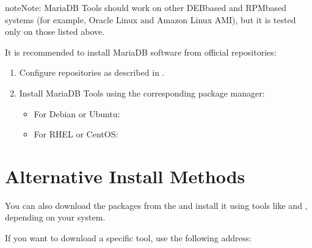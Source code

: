\documentclass[letterpaper,10pt,english]{sphinxmanual}
\begin{document}
\begin{sphinxadmonition}{note}{Note:}
MariaDB Tools should work on other DEB\sphinxhyphen{}based and RPM\sphinxhyphen{}based systems
(for example, Oracle Linux and Amazon Linux AMI),
but it is tested only on those listed above.
\end{sphinxadmonition}

It is recommended to install MariaDB software from official repositories:
\begin{enumerate}
%
\item {} 
Configure repositories as described in
.

\item {} 
Install MariaDB Tools using the corresponding package manager:
\begin{itemize}
\item {} 
For Debian or Ubuntu:

\begin{sphinxVerbatim}[commandchars=\\\{\}]
   
\end{sphinxVerbatim}

\item {} 
For RHEL or CentOS:

\begin{sphinxVerbatim}[commandchars=\\\{\}]
   
\end{sphinxVerbatim}

\end{itemize}

\end{enumerate}


\section{Alternative Install Methods}
\label{\detokenize{installation:alternative-install-methods}}
You can also download the packages from the
and install it using tools like  and ,
depending on your system.

If you want to download a specific tool, use the following address:
\end{document}
